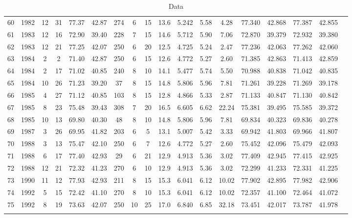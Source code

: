 \begin{longtable}{cccccccccccccccccc}
  60 & 1982 & 12 & 31 & 77.37 & 42.87 & 274 & 6 & 15 & 13.6 & 5.242 & 5.58 & 4.28 & 77.340 & 42.868 & 77.387 & 42.855 \\ 
  61 & 1983 & 12 & 16 & 72.90 & 39.40 & 228 & 7 & 15 & 14.6 & 5.712 & 5.90 & 7.06 & 72.870 & 39.379 & 72.932 & 39.380 \\ 
  62 & 1983 & 12 & 21 & 77.25 & 42.07 & 250 & 6 & 20 & 12.5 & 4.725 & 5.24 & 2.47 & 77.236 & 42.063 & 77.262 & 42.060 \\ 
  63 & 1984 & 2 & 2 & 71.40 & 42.87 & 250 & 6 & 15 & 12.6 & 4.772 & 5.27 & 2.60 & 71.385 & 42.863 & 71.413 & 42.859 \\ 
  64 & 1984 & 2 & 17 & 71.02 & 40.85 & 240 & 8 & 10 & 14.1 & 5.477 & 5.74 & 5.50 & 70.988 & 40.838 & 71.042 & 40.835 \\ 
  65 & 1984 & 10 & 26 & 71.23 & 39.20 & 37 & 8 & 15 & 14.8 & 5.806 & 5.96 & 7.81 & 71.261 & 39.228 & 71.269 & 39.178 \\ 
  66 & 1985 & 4 & 27 & 71.12 & 40.85 & 103 & 8 & 15 & 12.8 & 4.866 & 5.33 & 2.87 & 71.133 & 40.847 & 71.130 & 40.842 \\ 
  67 & 1985 & 8 & 23 & 75.48 & 39.43 & 308 & 7 & 20 & 16.5 & 6.605 & 6.62 & 22.24 & 75.381 & 39.495 & 75.585 & 39.372 \\ 
  68 & 1985 & 10 & 13 & 69.80 & 40.30 & 48 & 8 & 10 & 14.8 & 5.806 & 5.96 & 7.81 & 69.834 & 40.323 & 69.836 & 40.278 \\ 
  69 & 1987 & 3 & 26 & 69.95 & 41.82 & 203 & 6 & 5 & 13.1 & 5.007 & 5.42 & 3.33 & 69.942 & 41.803 & 69.966 & 41.807 \\ 
  70 & 1988 & 3 & 13 & 75.47 & 42.10 & 250 & 6 & 7 & 12.6 & 4.772 & 5.27 & 2.60 & 75.452 & 42.096 & 75.479 & 42.093 \\ 
  71 & 1988 & 6 & 17 & 77.40 & 42.93 & 29 & 6 & 21 & 12.9 & 4.913 & 5.36 & 3.02 & 77.409 & 42.945 & 77.415 & 42.925 \\ 
  72 & 1988 & 12 & 21 & 72.32 & 41.23 & 270 & 6 & 10 & 12.9 & 4.913 & 5.36 & 3.02 & 72.299 & 41.233 & 72.331 & 41.225 \\ 
  73 & 1990 & 11 & 12 & 77.93 & 42.93 & 211 & 8 & 15 & 15.3 & 6.041 & 6.12 & 10.02 & 77.902 & 42.895 & 77.982 & 42.906 \\ 
  74 & 1992 & 5 & 15 & 72.42 & 41.10 & 270 & 8 & 10 & 15.3 & 6.041 & 6.12 & 10.02 & 72.357 & 41.100 & 72.464 & 41.072 \\ 
  75 & 1992 & 8 & 19 & 73.63 & 42.07 & 250 & 10 & 25 & 17.0 & 6.840 & 6.85 & 32.18 & 73.451 & 42.017 & 73.787 & 41.978 \\ 
  \hline 
  \caption[Data]{Data \citep{HarvardCMT1} \citep{HarvardCMT2}}
     \label{table:Events}
\end{longtable}

